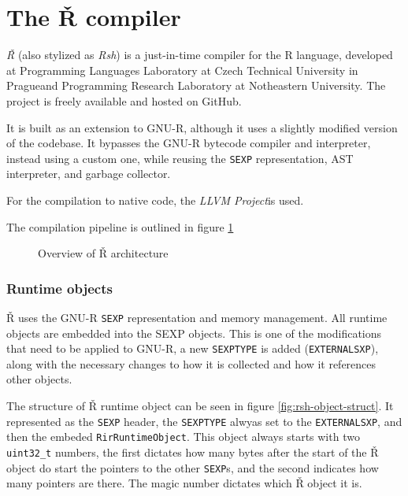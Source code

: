 \newpage
\section{The Ř compiler}

\textit{Ř} (also stylized as \textit{Rsh}) is a just-in-time compiler for the R language, developed at Programming Languages Laboratory at Czech Technical University in Prague\todocite and Programming Research Laboratory at Notheastern University\todocite. The project is freely available and hosted on GitHub.

It is built as an extension to GNU-R, although it uses a slightly modified version of the codebase. It bypasses the GNU-R bytecode compiler and interpreter, instead using a custom one, while reusing the \texttt{SEXP} representation, AST interpreter, and garbage collector.

For the compilation to native code, the \textit{LLVM Project}\todocite is used.

The compilation pipeline is outlined in figure \ref{fig:rsh-archit}

\begin{figure}
	\centering
  \caption{Overview of Ř architecture\cite{reusing-jit}}\label{fig:rsh-archit}
\end{figure}

\subsubsection*{Runtime objects}


Ř uses the GNU-R \texttt{SEXP} representation and memory management. All runtime objects are embedded into the SEXP objects. This is one of the modifications that need to be applied to GNU-R, a new \texttt{SEXPTYPE} is added (\texttt{EXTERNALSXP}), along with the necessary changes to how it is collected and how it references other objects.

The structure of Ř runtime object can be seen in figure \ref{fig:rsh-object-struct}. It represented as the \texttt{SEXP} header, the \texttt{SEXPTYPE} alwyas set to the \texttt{EXTERNALSXP}, and then the embeded \texttt{RirRuntimeObject}. This object always starts with two \texttt{uint32\_t} numbers, the first dictates how many bytes after the start of the Ř object do start the pointers to the other \texttt{SEXP}s, and the second indicates how many pointers are there. The magic number dictates which Ř object it is.

